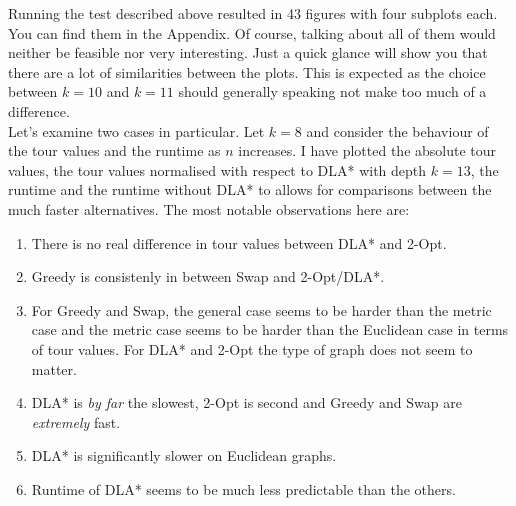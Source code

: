\documentclass{article}
\begin{document}
Running the test described above resulted in 43 figures with four subplots
each. You can find them in the Appendix. Of course, talking about all of them
would neither be feasible nor very interesting. Just a quick glance will show
you that there are a lot of similarities between the plots. This is expected
as the choice between $k=10$ and $k=11$ should generally speaking not make too
much of a difference.\\
Let's examine two cases in particular.
Let $k=8$ and consider the behaviour of
the tour values and the runtime as $n$ increases.
I have plotted the absolute tour values, the tour values normalised with
respect to DLA* with depth $k=13$, the runtime and the runtime without
DLA* to allows for comparisons between the much faster alternatives.
The most notable observations here are: 
\begin{enumerate}
    \item There is no real difference in tour values between DLA* and 2-Opt.
    \item Greedy is consistenly in between Swap and 2-Opt/DLA*.
    \item For Greedy and Swap, the general case seems to be harder than the
    metric case and the metric case seems to be harder than the Euclidean case
    in terms of tour values. For DLA* and 2-Opt the type of graph does not
    seem to matter.
    \item DLA* is \emph{by far} the slowest, 2-Opt is second and Greedy and 
    Swap are \emph{extremely} fast. 
    \item DLA* is significantly slower on Euclidean graphs.
    \item Runtime of DLA* seems to be much less predictable than the others.
\end{enumerate}
\end{document}
